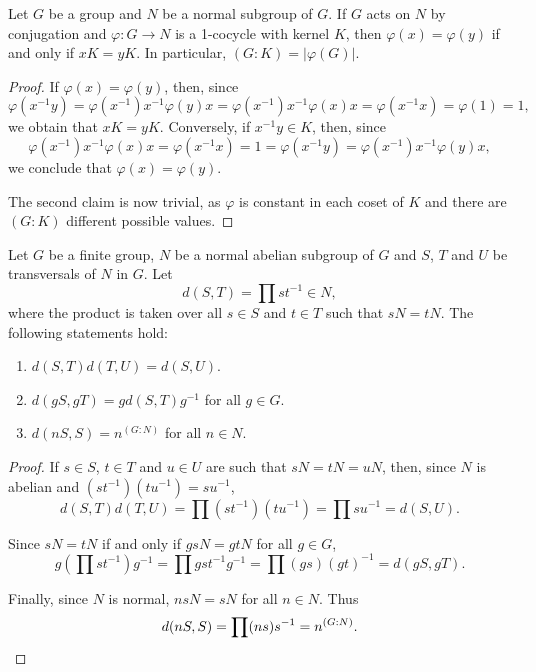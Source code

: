 \begin{lemma}
	\label{lem:1cocycle}
	Let $G$ be a group and $N$ be a normal subgroup of $G$. If $G$ acts on $N$ by conjugation and  
	$\varphi\colon G\to N$ is a 1-cocycle with kernel $K$, then 
	$\varphi(x)=\varphi(y)$ if and only if $xK=yK$. In particular,
	$(G:K)=|\varphi(G)|$. 
\end{lemma}

\begin{proof}
	If $\varphi(x)=\varphi(y)$, then, since 
	\[
		\varphi(x^{-1}y)
		=\varphi(x^{-1})x^{-1}\varphi(y)x
		=\varphi(x^{-1})x^{-1}\varphi(x)x
		=\varphi(x^{-1}x)=\varphi(1)
		=1,
	\]
	we obtain that $xK=yK$. Conversely, if $x^{-1}y\in K$, then, since 
	\[
	\varphi(x^{-1})x^{-1}\varphi(x)x=\varphi(x^{-1}x)=1=\varphi(x^{-1}y)=\varphi(x^{-1})x^{-1}\varphi(y)x,
	\]
	we conclude that 
	$\varphi(x)=\varphi(y)$.

	The second claim is now trivial, as $\varphi$ is constant in each coset of $K$ and
	there are $(G:K)$ different possible values. 
\end{proof}

\begin{lemma}
	\label{lem:d}
	Let $G$ be a finite group, $N$ be a normal abelian subgroup of $G$ and $S$, $T$ and $U$
	be transversals of $N$ in $G$. Let  
	\[
	d(S,T)=\prod st^{-1}\in N,
	\]
	where the product is taken over all $s\in S$ and $t\in T$ such that 
	$sN=tN$. The following statements hold:
	\begin{enumerate}
		\item $d(S,T)d(T,U)=d(S,U)$.
		\item $d(gS,gT)=gd(S,T)g^{-1}$ for all $g\in G$.
		\item $d(nS,S)=n^{(G:N)}$ for all $n\in N$.
	\end{enumerate}
\end{lemma}

\begin{proof}
	If $s\in S$, $t\in T$ and $u\in U$ are such that $sN=tN=uN$, then, since $N$ is
	abelian and $(st^{-1})(tu^{-1})=su^{-1}$, 
	\[
		d(S,T)d(T,U)=\prod (st^{-1})(tu^{-1})=\prod su^{-1}=d(S,U).
	\]

	Since $sN=tN$ if and only if $gsN=gtN$ for all $g\in G$, 
	\[
	g\left(\prod st^{-1}\right)g^{-1}=\prod gst^{-1}g^{-1}=\prod (gs)(gt)^{-1}=d(gS,gT).
	\]

	Finally, since $N$ is normal, $nsN=sN$ for all $n\in N$. Thus 
	\[
		d(nS,S)=\prod (ns)s^{-1}=n^{(G:N)}.\qedhere
	\]
\end{proof}

